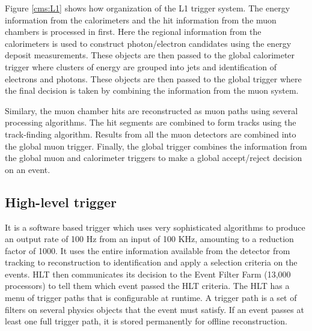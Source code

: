 Figure \ref{cms:L1} shows how organization of the L1 trigger system. The energy information from the calorimeters and the hit information from the muon chambers is processed in first. Here the regional information from the calorimeters is used to construct photon/electron candidates using the energy deposit measurements. These objects are then passed to the global calorimeter trigger where clusters of energy are grouped into jets and identification of electrons and photons. These objects are then passed to the global trigger where the final decision is taken by combining the information from the muon system.

Similary, the muon chamber hits are reconstructed as muon paths using several processing algorithms. The hit segments are combined to form tracks using the track-finding algorithm. Results from all the muon detectors are combined into the global muon trigger. Finally, the global trigger combines the information from the global muon and calorimeter triggers to make a global accept/reject decision on an event.

\subsection{High-level trigger}\label{hlttrigger}
It is a software based trigger which uses very sophisticated algorithms to produce an output rate of 100 Hz from an input of 100 KHz, amounting to a reduction factor of 1000. It uses the entire information available from the detector from tracking to reconstruction to identification and apply a selection criteria on the events. HLT then communicates its decision to the Event Filter Farm (13,000 processors) to tell them which event passed the HLT criteria. The HLT has a menu of trigger paths that is configurable at runtime. A trigger path is a set of filters on several physics objects that the event must satisfy. If an event passes at least one full trigger path, it is stored permanently for offline reconstruction.